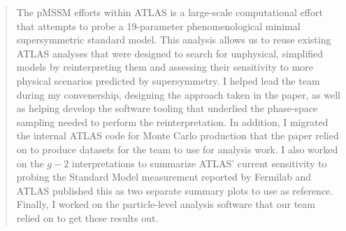 \begin{quotation}
	The pMSSM efforts within ATLAS is a large-scale computational effort that attempts to probe a 19-parameter phenomenological minimal supersymmetric standard model.
	This analysis allows us to reuse existing ATLAS analyses that were designed to search for unphysical, simplified models by reinterpreting them and assessing their sensitivity to more physical scenarios predicted by supersymmetry.
	I helped lead the team during my convenership, designing the approach taken in the paper, as well as helping develop the software tooling that underlied the phase-space sampling needed to perform the reinterpretation.
	In addition, I migrated the internal ATLAS code for Monte Carlo production that the paper relied on to produce datasets for the team to use for analysis work.
	I also worked on the $g-2$ interpretations to summarize ATLAS' current sensitivity to probing the Standard Model measurement reported by Fermilab and ATLAS published this as two separate summary plots to use as reference.
	Finally, I worked on the particle-level analysis software that our team relied on to get these results out.
\end{quotation}
